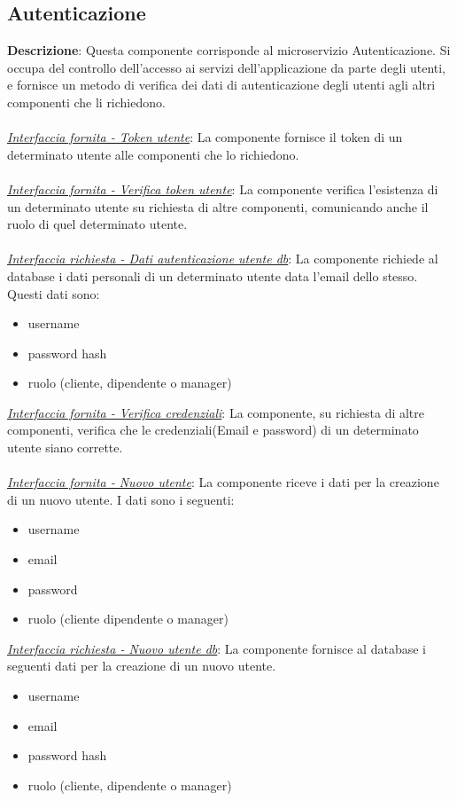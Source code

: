 \documentclass{report}
\begin{document}
\subsection*{Autenticazione}
\textbf{Descrizione}: Questa componente corrisponde al microservizio Autenticazione. Si occupa del controllo dell'accesso ai servizi dell'applicazione da parte degli utenti,
e fornisce un metodo di verifica dei dati di autenticazione degli utenti agli altri componenti che li richiedono.\\ \\
\uline{\textit{Interfaccia fornita - Token utente}}: 
La componente fornisce il token di un determinato utente alle componenti che lo richiedono.\\ \\ 
\uline{\textit{Interfaccia fornita - Verifica token utente}}: 
La componente verifica l'esistenza di un determinato utente su richiesta di altre componenti, comunicando anche il ruolo di quel determinato utente.\\ \\ 
\uline{\textit{Interfaccia richiesta - Dati autenticazione utente db}}: 
La componente richiede al database i dati personali di un determinato utente data l'email dello stesso. Questi dati sono:
\begin{itemize}
	\item username
	\item password hash
	\item ruolo (cliente, dipendente o manager)
\end{itemize}
\uline{\textit{Interfaccia fornita - Verifica credenziali}}: 
La componente, su richiesta di altre componenti, verifica che le credenziali(Email e password) di un determinato utente siano corrette.\\ \\ 
\uline{\textit{Interfaccia fornita - Nuovo utente}}: 
La componente riceve i dati per la creazione di un nuovo utente. I dati sono i seguenti:
\begin{itemize}
	\item username
	\item email
	\item password
	\item ruolo (cliente dipendente o manager)
\end{itemize}
\uline{\textit{Interfaccia richiesta - Nuovo utente db}}: 
La componente fornisce al database i seguenti dati per la creazione di un nuovo utente.
\begin{itemize}
	\item username
	\item email
	\item password hash
	\item ruolo (cliente, dipendente o manager)
	
\end{itemize}
\end{document}
